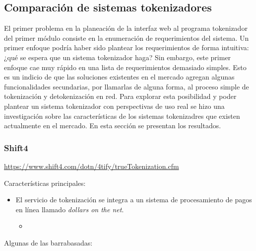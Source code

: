 %
%

\subsection{Comparación de sistemas tokenizadores}

El primer problema en la planeación de la interfaz web al programa tokenizador
del primer módulo consiste en la enumeración de requerimientos del sistema. Un
primer enfoque podría haber sido plantear los requerimientos de forma intuitiva:
¿qué se espera que un sistema tokenizador haga? Sin embargo, este primer
enfoque cae muy rápido en una lista de requerimientos demasiado simples. Esto
es un indicio de que las soluciones existentes en el mercado agregan algunas
funcionalidades secundarias, por llamarlas de alguna forma, al proceso simple de
tokenización y detokenización en red. Para explorar esta posibilidad y poder
plantear un sistema tokenizador con perspectivas de uso real se hizo una
investigación sobre las características de los sistemas tokenizadres que existen
actualmente en el mercado. En esta sección se presentan los resultados.

\subsubsection{Shift4}

\url{https://www.shift4.com/dotn/4tify/trueTokenization.cfm}

Características principales:

\begin{itemize}

  \item El servicio de tokenización se integra a un sistema de procesamiento de
    pagos en línea llamado \textit{dollars on the net}.

    \begin{itemize}
      \item
    \end{itemize}

\end{itemize}


Algunas de las barrabasadas:

